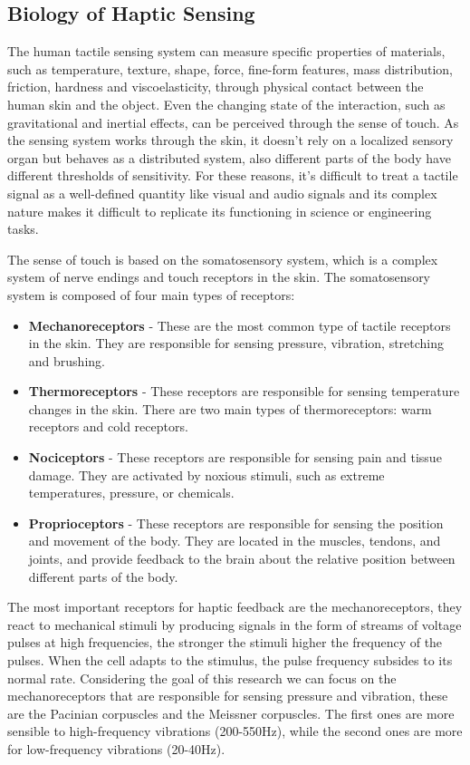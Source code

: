 \subsection{Biology of Haptic Sensing}
The human tactile sensing system can measure specific properties of materials, such as
temperature, texture, shape, force, fine-form features, mass distribution, friction, hardness
and viscoelasticity, through physical contact between the human skin and the object.
Even the changing state of the interaction, such as gravitational and inertial effects, can
be perceived through the sense of touch. 
As the sensing system works through the skin, it doesn't rely on a localized sensory organ but behaves as a distributed system, also different parts of the body have different thresholds of sensitivity.
For these reasons, it's difficult to treat a tactile signal as a well-defined quantity like visual and
audio signals and its complex nature makes it difficult to replicate its functioning in
science or engineering tasks.

The sense of touch is based on the somatosensory system, which is a complex system of nerve endings and touch receptors in the skin. The somatosensory system is composed of four main types of receptors:
\begin{itemize}
    \item \textbf{Mechanoreceptors} - These are the most common type of tactile receptors in the skin. They are responsible for sensing pressure, vibration, stretching and brushing.
    \item \textbf{Thermoreceptors} - These receptors are responsible for sensing temperature changes in the skin. There are two main types of thermoreceptors: warm receptors and cold receptors.
    \item \textbf{Nociceptors} - These receptors are responsible for sensing pain and tissue damage. They are activated by noxious stimuli, such as extreme temperatures, pressure, or chemicals.
    \item \textbf{Proprioceptors} - These receptors are responsible for sensing the position and movement of the body. They are located in the muscles, tendons, and joints, and provide feedback to the brain about the relative position between different parts of the body.
\end{itemize}

The most important receptors for haptic feedback are the mechanoreceptors, they react to mechanical stimuli by producing signals in the form of streams of voltage pulses at high frequencies, the stronger the stimuli higher the frequency of the pulses. When the cell adapts to the stimulus, the pulse frequency subsides to its normal rate.
Considering the goal of this research we can focus on the mechanoreceptors that are responsible for sensing pressure and vibration, these are the Pacinian corpuscles and the Meissner corpuscles.
The first ones are more sensible to high-frequency vibrations (200-550Hz), while the second ones are more for low-frequency vibrations (20-40Hz). \cite{Alg_Wearable_Tech_Nicole}